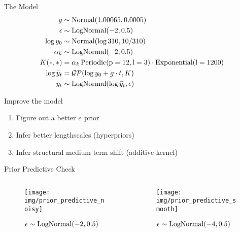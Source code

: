 \documentclass{beamer}
\begin{document}
\begin{frame}{The Model}
    \begin{align*}
        g &\sim \operatorname{Normal}(1.00065, 0.0005)\\
        {\epsilon} &\sim \operatorname{LogNormal}(-2, 0.5)\\
        \log y_0 &\sim \operatorname{Normal}(\log 310, 10/310)\\
        \alpha_k & \sim \operatorname{LogNormal}(-2, 0.5)\\
        K(*, *) &= \alpha_k \operatorname{Periodic}({\textnormal{p}}=12, {\textnormal{l}}=3)\cdot\operatorname{Exponential}({\textnormal{l}}=1200)\\
        \log \bar y_t &= \mathcal{GP}(\log y_0 + g \cdot t, K)\\
        y_t & \sim \operatorname{LogNormal}(\log \bar y_t, {\epsilon})
    \end{align*}
    \begin{block}{Improve the model}
    \begin{enumerate}
        \item Figure out a better ${\epsilon}$ prior
        \item Infer better lengthscales (hyperpriors)
        \item Infer structural medium term shift (additive kernel)
    \end{enumerate}
    \end{block}
\end{frame}
\begin{frame}{Prior Predictive Check}
    \begin{columns}
        \begin{column}{0.5\linewidth}
        \begin{figure}
            \centering
            \texttt{[image: img/prior\_predictive\_noisy]}
            \caption{${\epsilon} \sim \operatorname{LogNormal}(-2, 0.5)$}
        \end{figure}
        \end{column}
        \begin{column}{0.5\linewidth}
        \begin{figure}
            \centering
            \texttt{[image: img/prior\_predictive\_smooth]}
            \caption{${\epsilon} \sim \operatorname{LogNormal}(-4, 0.5)$}
        \end{figure}
        \end{column}
    \end{columns}
\end{frame}
\end{document}
